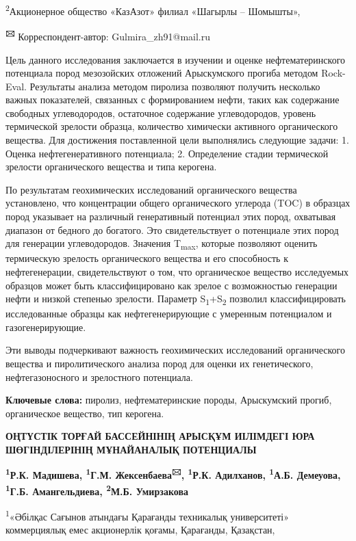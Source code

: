 \textsuperscript{2}Акционерное общество «КазАзот» филиал «Шагырлы --
Шомышты»,

{\bfseries \textsuperscript{🖂}} Корреспондент-автор: Gulmira\_zh91@mail.ru

Цель данного исследования заключается в изучении и оценке
нефтематеринского потенциала пород мезозойских отложений Арыскумского
прогиба методом Rock-Eval. Результаты анализа методом пиролиза позволяют
получить несколько важных показателей, связанных с формированием нефти,
таких как содержание свободных углеводородов, остаточное содержание
углеводородов, уровень термической зрелости образца, количество
химически активного органического вещества. Для достижения поставленной
цели выполнялись следующие задачи: 1. Оценка нефтегенеративного
потенциала; 2. Определение стадии термической зрелости органического
вещества и типа керогена.

По результатам геохимических исследований органического вещества
установлено, что концентрации общего органического углерода (TOC) в
образцах пород указывает на различный генеративный потенциал этих пород,
охватывая диапазон от бедного до богатого. Это свидетельствует о
потенциале этих пород для генерации углеводородов. Значения
T\textsubscript{max}, которые позволяют оценить термическую зрелость
органического вещества и его способность к нефтегенерации,
свидетельствуют о том, что органическое вещество исследуемых образцов
может быть классифицировано как зрелое с возможностью генерации нефти и
низкой степенью зрелости. Параметр S\textsubscript{1}+S\textsubscript{2}
позволил классифицировать исследованные образцы как нефтегенерирующие с
умеренным потенциалом и газогенерирующие.

Эти выводы подчеркивают важность геохимических исследований
органического вещества и пиролитического анализа пород для оценки их
генетического, нефтегазоносного и зрелостного потенциала.

{\bfseries Ключевые слова:} пиролиз, нефтематеринские породы, Арыскумский
прогиб, органическое вещество, тип керогена.

{\bfseries ОҢТҮСТІК ТОРҒАЙ БАССЕЙНІНІҢ АРЫСҚҰМ ИІЛІМДЕГІ ЮРА ШӨГІНДІЛЕРІНІҢ
МҰНАЙАНАЛЫҚ ПОТЕНЦИАЛЫ}

{\bfseries \textsuperscript{1}Р.К. Мадишева, \textsuperscript{1}Г.М.
Жексенбаева\textsuperscript{🖂}, \textsuperscript{1}Р.К. Адилханов,
\textsuperscript{1}А.Б. Демеуова,\\
\textsuperscript{1}Г.Б. Амангельдиева, \textsuperscript{2}М.Б.
Умирзакова}

\textsuperscript{1}«Әбілқас Сағынов атындағы Қарағанды техникалық
университеті» коммерциялық емес акционерлік қоғамы, Қарағанды,
Қазақстан,

